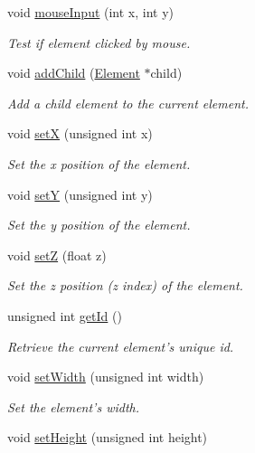 \begin{DoxyCompactItemize}
void \hyperlink{class_element_aa1a3a8de669ecc840d2f2fb1e338300f}{mouse\-Input} (int x, int y)
\begin{DoxyCompactList}\small\item\em Test if element clicked by mouse. \end{DoxyCompactList}\item 
void \hyperlink{class_element_a5e5de37f6b79a3a952d021ba15b3912d}{add\-Child} (\hyperlink{class_element}{Element} $\ast$child)
\begin{DoxyCompactList}\small\item\em Add a child element to the current element. \end{DoxyCompactList}\item 
void \hyperlink{class_element_ae222484e55d330ddfd7869510b10ec09}{set\-X} (unsigned int x)
\begin{DoxyCompactList}\small\item\em Set the x position of the element. \end{DoxyCompactList}\item 
void \hyperlink{class_element_a95ea0342571b8521028b8321ba915227}{set\-Y} (unsigned int y)
\begin{DoxyCompactList}\small\item\em Set the y position of the element. \end{DoxyCompactList}\item 
void \hyperlink{class_element_aab1f2476247f365f6755dc2913d205b3}{set\-Z} (float z)
\begin{DoxyCompactList}\small\item\em Set the z position (z index) of the element. \end{DoxyCompactList}\item 
unsigned int \hyperlink{class_element_a4d41f5af2e3e5787945915a3b803131a}{get\-Id} ()
\begin{DoxyCompactList}\small\item\em Retrieve the current element's unique id. \end{DoxyCompactList}\item 
void \hyperlink{class_element_a185f979ca317ede0dd270c7940b2a0a2}{set\-Width} (unsigned int width)
\begin{DoxyCompactList}\small\item\em Set the element's width. \end{DoxyCompactList}\item 
void \hyperlink{class_element_aa3aaacaf56fb94deaa14f6b0d172ab65}{set\-Height} (unsigned int height)

\end{DoxyCompactItemize}
